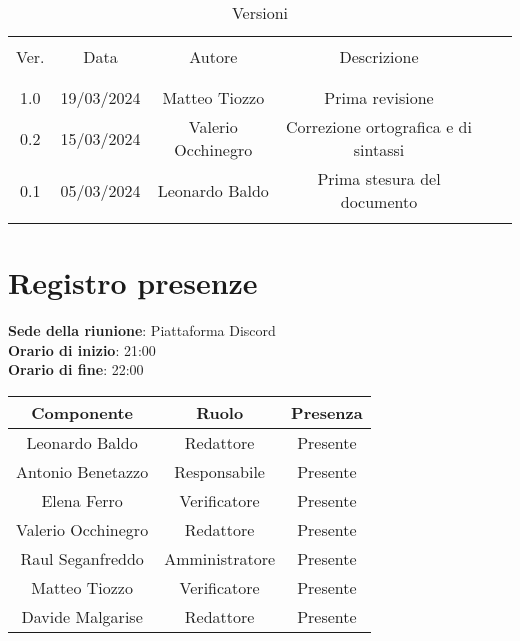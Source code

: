 \documentclass[italian,12pt]{article} %
\begin{document}


\newpage





\begin{table}[!h]
	\caption{Versioni}
	\begin{center}
		\begin{tabular}{ c c c c c c }
			\hline \\[-2ex]
			Ver. & Data & Autore & Descrizione \\
			\\[-2ex] \hline \\[-1.5ex]
			1.0 & 19/03/2024 & Matteo Tiozzo & Prima revisione \\
			0.2 & 15/03/2024 & Valerio Occhinegro& Correzione ortografica e di sintassi  \\
			0.1 & 05/03/2024 & Leonardo Baldo& Prima stesura del documento\\
			\\[-1.5ex] \hline
		\end{tabular}
	\end{center}
\end{table}
\newpage

\tableofcontents

\newpage

\section{Registro presenze}


\textbf{Sede della riunione}: Piattaforma Discord\\
\textbf{Orario di inizio}: 21:00\\
\textbf{Orario di fine}: 22:00\\


\begin{flushleft}
	\begin{table}[!h]
	\begin{tabular}{ |c|c|c| } 
		\hline
		\textbf{Componente} & \textbf{Ruolo} & \textbf{Presenza} \\
		\hline 
		Leonardo Baldo 		& Redattore & Presente \\ 
		Antonio Benetazzo 	& Responsabile & Presente \\
		Elena Ferro 		& Verificatore & Presente \\
		Valerio Occhinegro 	& Redattore & Presente \\
		Raul Seganfreddo 	& Amministratore & Presente \\
		Matteo Tiozzo 		& Verificatore & Presente \\ 
		Davide Malgarise 	& Redattore & Presente \\
		\hline
	\end{tabular}
	\end{table}
	\end{flushleft}
\end{document}
